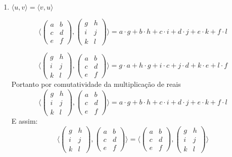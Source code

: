 \documentclass[12pt, twoside, a4]{article} %
\begin{document}
\begin{enumerate}
    \item $ \langle u, v \rangle =  \langle v, u \rangle $
        
    \[ \langle \begin{pmatrix} 
        a & b \\
        c & d \\
        e & f
       \end{pmatrix} ,\begin{pmatrix} 
        g & h \\
        i & j \\
        k & l
       \end{pmatrix} \rangle =  a \cdot  g + b \cdot h +
       c \cdot i + d \cdot j +
       e \cdot k + f  \cdot l 
        \]
    
    \[ \langle \begin{pmatrix} 
        g & h \\
        i & j \\
        k & l
        \end{pmatrix},\begin{pmatrix} 
            a & b \\
            c & d \\
            e & f
       \end{pmatrix} \rangle =  g \cdot  a + h \cdot g +
       i \cdot c + j \cdot d +
       k \cdot e + l  \cdot f 
        \]
    Portanto por comutatividade da multiplicação de reais
    \[ \langle \begin{pmatrix} 
        g & h \\
        i & j \\
        k & l
        \end{pmatrix},\begin{pmatrix} 
            a & b \\
            c & d \\
            e & f
       \end{pmatrix} \rangle =  a \cdot  g + b \cdot h +
       c \cdot i + d \cdot j +
       e \cdot k + f  \cdot l 
        \]
    E assim:
    \[ \langle \begin{pmatrix} 
        g & h \\
        i & j \\
        k & l
        \end{pmatrix},\begin{pmatrix} 
            a & b \\
            c & d \\
            e & f
       \end{pmatrix} \rangle = \langle \begin{pmatrix} 
        a & b \\
        c & d \\
        e & f
       \end{pmatrix} ,\begin{pmatrix} 
        g & h \\
        i & j \\
        k & l
       \end{pmatrix} \rangle \]


\end{enumerate}
\end{document}
